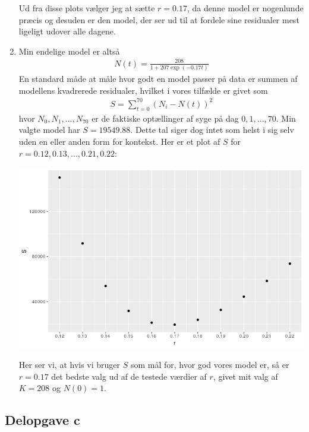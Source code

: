 \documentclass[12pt]{article}
\begin{document}
\begin{enumerate}
\begin{center}
\end{center}
Ud fra disse plots vælger jeg at sætte $r=0.17$, da denne model er nogenlunde præcis og desuden er den model, der ser ud til at fordele sine residualer mest ligeligt udover alle dagene.
\item Min endelige model er altså
\begin{align}
N(t) = \frac{208}{1 + 207\exp(-0.17t)}
\end{align}
En standard måde at måle hvor godt en model passer på data er summen af modellens kvadrerede residualer, hvilket i vores tilfælde er givet som
\begin{align}
S = \sum_{t=0}^{70} (N_i - N(t))^2
\end{align}
hvor $N_0, N_1, ..., N_{70}$ er de faktiske optællinger af syge på dag $0,1,...,70$. Min valgte model har $S=19549.88$. Dette tal siger dog intet som helst i sig selv uden en eller anden form for kontekst. Her er et plot af $S$ for $r=0.12,0.13,...,0.21,0.22$:
\begin{center}
\includegraphics[scale=0.5]{q2p5.png}
\end{center}
Her ser vi, at hvis vi bruger $S$ som mål for, hvor god vores model er, så er $r=0.17$ det bedste valg ud af de testede værdier af $r$, givet mit valg af $K=208$ og $N(0)=1$.
\end{enumerate}

\subsection{Delopgave c}
\end{document}
